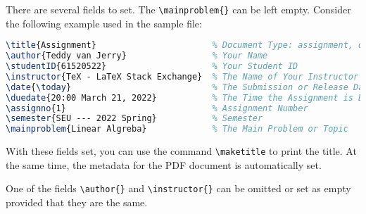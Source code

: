 \documentclass[twoside]{seu-ml-assign}
\begin{document}


      There are several fields to set.
      The \verb|\mainproblem{}| can be left empty.
      Consider the following example used in the sample file:
      \begin{lstlisting}[language=tex,numbers=none]
\title{Assignment}                       % Document Type: assignment, quiz, etc.
\author{Teddy van Jerry}                 % Your Name
\studentID{61520522}                     % Your Student ID
\instructor{TeX - LaTeX Stack Exchange}  % The Name of Your Instructor
\date{\today}                            % The Submission or Release Date
\duedate{20:00 March 21, 2022}           % The Time the Assignment is Due
\assignno{1}                             % Assignment Number
\semester{SEU --- 2022 Spring}           % Semester
\mainproblem{Linear Algreba}             % The Main Problem or Topic
      \end{lstlisting}
    
      With these fields set, you can use the command \verb|\maketitle| to print the title.
      At the same time, the metadata for the PDF document is automatically set.

    \label{subsec:prob_only_properties}
    One of the fields \verb|\author{}| and \verb|\instructor{}| can be omitted or set as empty provided that they are the same.


    \label{subsec:section_normal_title}
\end{document}

